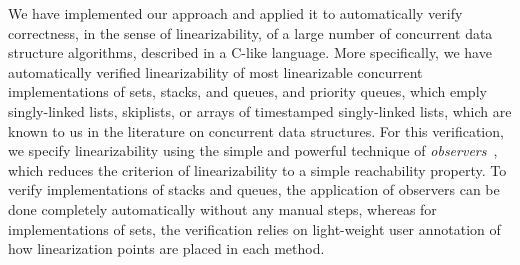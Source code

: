 We have implemented our approach and applied it to automatically verify
correctness, in the sense of linearizability, of a large number of
concurrent data structure algorithms, described in a C-like language.
More specifically, we have automatically verified linearizability of 
most linearizable concurrent implementations
of sets, stacks, and queues, and priority queues,
which emply singly-linked lists, skiplists, or
arrays of timestamped singly-linked lists, which are known to us in
the literature on concurrent data structures.
For this verification, we specify linearizability
using the simple and powerful technique of
{\em observers}~\cite{AHHR:integrated,BEEH:icalp15,HSV:concur13,Quy:sas16},
which reduces the criterion of linearizability to a simple reachability
property. To verify implementations of stacks and queues, 
the application of observers can be done completely automatically without
any manual steps, whereas for implementations of sets, the verification relies
on light-weight user annotation of how linearization points are placed in
each method.

